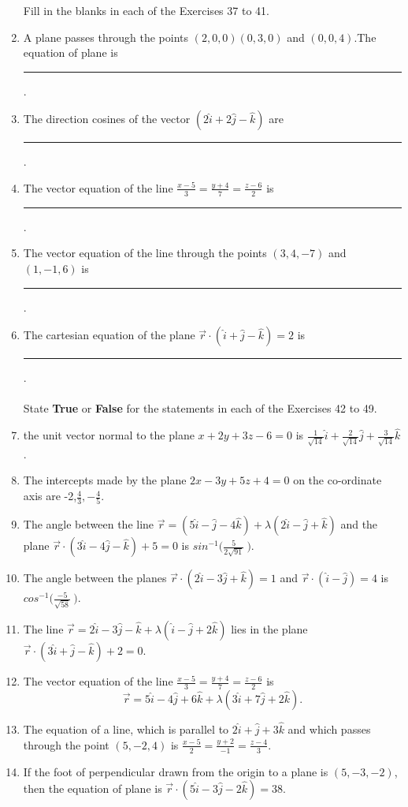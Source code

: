 \documentclass[12pt]{article}
\begin{document}
\begin{enumerate}
Fill in the blanks in each of the Exercises 37 to 41.
\item A plane passes through the points $(2,0,0) (0,3,0)$ and $(0,0,4)$.The equation of plane is \noindent\rule{2cm}{0.4pt}.
\item The direction cosines of the vector $(2\hat{i}+2\hat{j}-\hat{k})$ are \noindent\rule{2cm}{0.4pt}.
\item The vector equation of the line \(\displaystyle \frac{x-5}{3}=\frac{y+4}{7}=\frac{z-6}{2}\) is \noindent\rule{2cm}{0.4pt}. 
\item The vector equation of the line through the points $(3,4,-7)$ and $(1,-1,6)$ is \noindent\rule{2cm}{0.4pt}.
\item The cartesian equation of the plane $\overrightarrow{r} \cdot (\hat{i}+\hat{j}-\hat{k})=2$ is \noindent\rule{2cm}{0.4pt}.
\\\\State \textbf{True} or \textbf{False} for the statements in each of the Exercises 42 to 49.
\item the unit vector normal to the plane $x+2y+3z-6=0$ is \(\displaystyle \frac{1}{\sqrt{14}}\hat{i} + \frac{2}{\sqrt{14}}\hat{j} + \frac{3}{\sqrt{14}}\hat{k}\).
\item The intercepts made by the plane $2x-3y+5z+4=0$ on the co-ordinate axis are -2,\(\displaystyle \frac{4}{3},-\frac{4}{5}\).
\item The angle between the line $\overrightarrow{r}=(5\hat{i}-\hat{j}-4\hat{k})+\lambda(2\hat{i}-\hat{j}+\hat{k})$ and the plane $\overrightarrow{r} \cdot (3\hat{i}-4\hat{j}-\hat{k})+5=0$ is $sin^{-1}\Biggl(\displaystyle\frac{5}{2\sqrt{91}}\ \Biggr)$.
\item The angle between the planes $\overrightarrow{r} \cdot (2\hat{i}-3\hat{j}+\hat{k})=1$ and $\overrightarrow{r} \cdot (\hat{i}-\hat{j})=4$ is $cos^{-1} \Biggl(\displaystyle\frac{-5}{\sqrt{58}}\ \Biggr)$.
\item The line $\overrightarrow{r}=2\hat{i}-3\hat{j}-\hat{k}+\lambda(\hat{i}-\hat{j}+2\hat{k})$ lies in the plane $\overrightarrow{r} \cdot (3\hat{i}+\hat{j}-\hat{k})+2=0$.
\item The vector equation of the line \(\displaystyle\frac{x-5}{3}=\frac{y+4}{7}=\frac{z-6}{2}\) is\\
$$\overrightarrow{r}=5\hat{i}-4\hat{j}+6\hat{k}+\lambda(3\hat{i}+7\hat{j}+2\hat{k}).$$
\item The equation of a line, which is parallel to $2\hat{i}+\hat{j}+3\hat{k}$ and which passes through the point $(5,-2,4)$ is \(\displaystyle \frac{x-5}{2}=\frac{y+2}{-1}=\frac{z-4}{3}\).
\item If the foot of perpendicular drawn from the origin to a plane is $(5,-3,-2)$, then the equation of plane is $\overrightarrow{r} \cdot (5\hat{i}-3\hat{j}-2\hat{k})=38.$
\end{enumerate}
\end{document}
